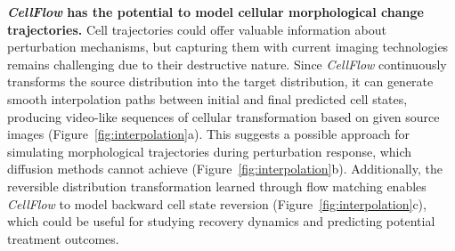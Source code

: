 \textbf{\emph{CellFlow} has the potential to model cellular morphological change trajectories.}
Cell trajectories could offer valuable information about perturbation mechanisms, but capturing them with current imaging technologies remains challenging due to their destructive nature. Since \emph{CellFlow} continuously transforms the source distribution into the target distribution, it can generate smooth interpolation paths between initial and final predicted cell states, producing video-like sequences of cellular transformation based on given source images (Figure~\ref{fig:interpolation}a). This suggests a possible approach for simulating morphological trajectories during perturbation response, which diffusion methods cannot achieve (Figure~\ref{fig:interpolation}b). Additionally, the reversible distribution transformation learned through flow matching enables \emph{CellFlow} to model backward cell state reversion (Figure~\ref{fig:interpolation}c), which could be useful for studying recovery dynamics and predicting potential treatment outcomes.
